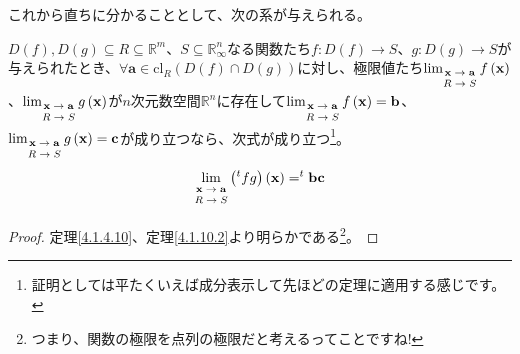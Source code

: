\documentclass[dvipdfmx]{jsarticle}
\begin{document}
これから直ちに分かることとして、次の系が与えられる。
\begin{thm}\label{4.1.10.10s}
$D(f),D(g) \subseteq R \subseteq \mathbb{R}^{m}$、$S \subseteq \mathbb{R}_{\infty}^{n}$なる関数たち$f:D(f) \rightarrow S$、$g:D(g) \rightarrow S$が与えられたとき、$\forall\mathbf{a} \in \mathrm{cl}_{R}\left( D(f) \cap D(g) \right)$に対し、極限値たち$\lim_{\scriptsize \begin{matrix} \mathbf{x} \rightarrow \mathbf{a} \\ R \rightarrow S \\\end{matrix}}{f\left( \mathbf{x} \right)}$、$\lim_{\scriptsize \begin{matrix} \mathbf{x} \rightarrow \mathbf{a} \\ R \rightarrow S \\\end{matrix}}{g\left( \mathbf{x} \right)}$が$n$次元数空間$\mathbb{R}^{n}$に存在して$\lim_{\scriptsize \begin{matrix} \mathbf{x} \rightarrow \mathbf{a} \\ R \rightarrow S \\\end{matrix}}{f\left( \mathbf{x} \right)} = \mathbf{b}$、$\lim_{\scriptsize \begin{matrix} \mathbf{x} \rightarrow \mathbf{a} \\ R \rightarrow S \\\end{matrix}}{g\left( \mathbf{x} \right)} = \mathbf{c}$が成り立つなら、次式が成り立つ\footnote{証明としては平たくいえば成分表示して先ほどの定理に適用する感じです。}。
\begin{align*}
\lim_{\scriptsize \begin{matrix} \mathbf{x} \rightarrow \mathbf{a} \\ R \rightarrow S \\\end{matrix}}{\left(^{t}fg \right)\left( \mathbf{x} \right)} =^{t}\mathbf{bc}
\end{align*}
\end{thm}
\begin{proof} 定理\ref{4.1.4.10}、定理\ref{4.1.10.2}より明らかである\footnote{つまり、関数の極限を点列の極限だと考えるってことですね! }。
\end{proof}
\end{document}
